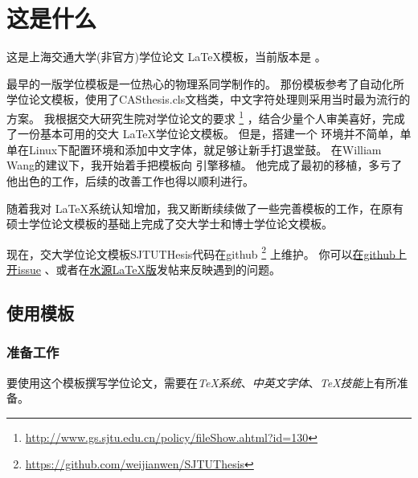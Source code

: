 
\chapter{这是什么}
\label{chap:what}

这是上海交通大学(非官方)学位论文 \LaTeX 模板，当前版本是 \version 。

最早的一版学位模板是一位热心的物理系同学制作的。
那份模板参考了自动化所学位论文模板，使用了CASthesis.cls文档类，中文字符处理则采用当时最为流行的 \CJKLaTeX 方案。
我根据交大研究生院对学位论文的要求
\footnote{\url{http://www.gs.sjtu.edu.cn/policy/fileShow.ahtml?id=130}}
，结合少量个人审美喜好，完成了一份基本可用的交大 \LaTeX 学位论文模板。
但是，搭建一个 \CJKLaTeX 环境并不简单，单单在Linux下配置环境和添加中文字体，就足够让新手打退堂鼓。
在William Wang的建议下，我开始着手把模板向 \XeTeX 引擎移植。
他完成了最初的移植，多亏了他出色的工作，后续的改善工作也得以顺利进行。

随着我对 \LaTeX 系统认知增加，我又断断续续做了一些完善模板的工作，在原有硕士学位论文模板的基础上完成了交大学士和博士学位论文模板。

现在，交大学位论文模板SJTUTHesis代码在github
\footnote{\url{https://github.com/weijianwen/SJTUThesis}}
上维护。
你可以\href{https://github.com/weijianwen/SJTUThesis/issues}{在github上开issue}
、或者在\href{https://bbs.sjtu.edu.cn/bbsdoc?board=TeX_LaTeX}{水源LaTeX版}发帖来反映遇到的问题。

\section{使用模板}

\subsection{准备工作}
\label{sec:requirements}

要使用这个模板撰写学位论文，需要在\emph{TeX系统}、\emph{中英文字体}、\emph{TeX技能}上有所准备。

